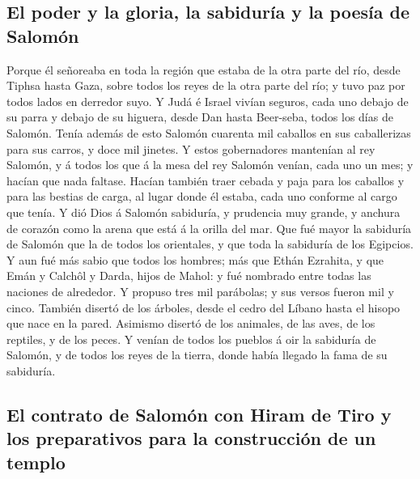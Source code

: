 \hypertarget{el-poder-y-la-gloria-la-sabiduruxeda-y-la-poesuxeda-de-salomuxf3n}{%
\subsection{El poder y la gloria, la sabiduría y la poesía de
Salomón}\label{el-poder-y-la-gloria-la-sabiduruxeda-y-la-poesuxeda-de-salomuxf3n}}

 Porque él señoreaba en toda la región que estaba de la
otra parte del río, desde Tiphsa hasta Gaza, sobre todos los reyes de la
otra parte del río; y tuvo paz por todos lados en derredor suyo.
 Y Judá é Israel vivían seguros, cada uno debajo de su
parra y debajo de su higuera, desde Dan hasta Beer-seba, todos los días
de Salomón.  Tenía además de esto Salomón cuarenta mil
caballos en sus caballerizas para sus carros, y doce mil jinetes.
 Y estos gobernadores mantenían al rey Salomón, y á todos
los que á la mesa del rey Salomón venían, cada uno un mes; y hacían que
nada faltase.  Hacían también traer cebada y paja para los
caballos y para las bestias de carga, al lugar donde él estaba, cada uno
conforme al cargo que tenía.  Y dió Dios á Salomón
sabiduría, y prudencia muy grande, y anchura de corazón como la arena
que está á la orilla del mar.  Que fué mayor la sabiduría
de Salomón que la de todos los orientales, y que toda la sabiduría de
los Egipcios.  Y aun fué más sabio que todos los hombres;
más que Ethán Ezrahita, y que Emán y Calchôl y Darda, hijos de Mahol: y
fué nombrado entre todas las naciones de alrededor.  Y
propuso tres mil parábolas; y sus versos fueron mil y cinco.
 También disertó de los árboles, desde el cedro del Líbano
hasta el hisopo que nace en la pared. Asimismo disertó de los animales,
de las aves, de los reptiles, y de los peces.  Y venían de
todos los pueblos á oir la sabiduría de Salomón, y de todos los reyes de
la tierra, donde había llegado la fama de su sabiduría.

\hypertarget{el-contrato-de-salomuxf3n-con-hiram-de-tiro-y-los-preparativos-para-la-construcciuxf3n-de-un-templo}{%
\subsection{El contrato de Salomón con Hiram de Tiro y los preparativos
para la construcción de un
templo}\label{el-contrato-de-salomuxf3n-con-hiram-de-tiro-y-los-preparativos-para-la-construcciuxf3n-de-un-templo}}

